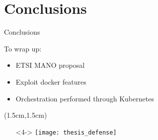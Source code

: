 \section{Conclusions}
\begin{frame}{Conclusions}

  To wrap up:
  \begin{itemize}
  \item<1-> ETSI MANO proposal
  \item<2-> Exploit docker features
  \item<3-> Orchestration performed through Kubernetes
  \end{itemize}

  \begin{textblock*}{5cm}(1.5cm,1.5cm)
    \begin{itemize}
      \item[]<4-> \centering \texttt{[image: thesis\_defense]}
    \end{itemize}
  \end{textblock*}
\end{frame}
